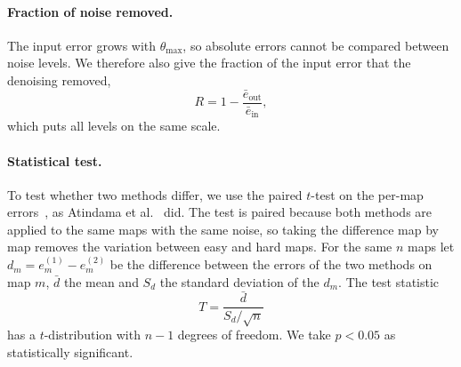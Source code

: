 \paragraph{Fraction of noise removed.}
The input error grows with $\theta_{\max}$, so absolute errors cannot be
compared between noise levels. We therefore also give the fraction of the
input error that the denoising removed,
\begin{equation}
  R = 1 - \frac{\bar{e}_{\text{out}}}{\bar{e}_{\text{in}}},
  \label{eq:removed}
\end{equation}
which puts all levels on the same scale.

\paragraph{Statistical test.}
To test whether two methods differ, we use the paired $t$-test on the
per-map errors~\cite{neter1996applied}, as Atindama et
al.~\cite{atindama2023restoration} did. The test is paired because both
methods are applied to the same maps with the same noise, so taking the
difference map by map removes the variation between easy and hard maps. For
the same $n$ maps let $d_m = e^{(1)}_m - e^{(2)}_m$ be the difference between
the errors of the two methods on map $m$, $\bar{d}$ the mean and $S_d$ the
standard deviation of the $d_m$. The test statistic
\begin{equation}
  T = \frac{\bar{d}}{S_d / \sqrt{n}}
  \label{eq:ttest}
\end{equation}
has a $t$-distribution with $n-1$ degrees of freedom. We take $p < 0.05$ as
statistically significant.
